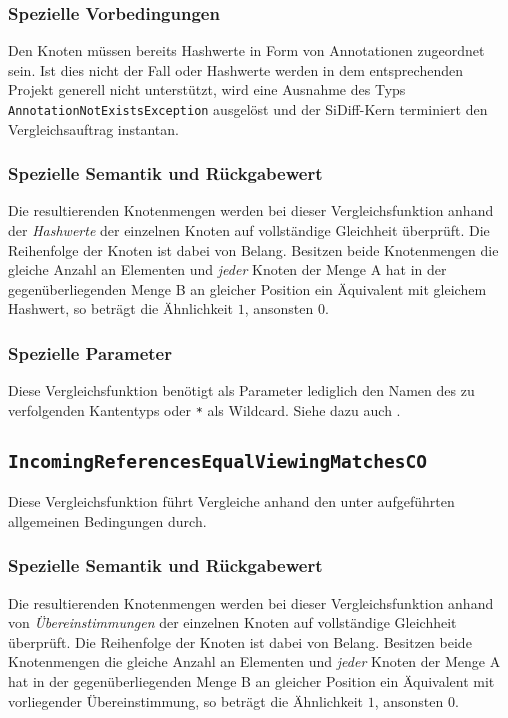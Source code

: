 \subsubsection*{Spezielle Vorbedingungen}
Den Knoten müssen bereits Hashwerte in Form von Annotationen zugeordnet sein. Ist dies nicht der Fall oder Hashwerte werden in dem entsprechenden Projekt generell nicht unterstützt, wird eine Ausnahme des Typs \texttt{AnnotationNotExistsException} ausgelöst und der SiDiff-Kern terminiert den Vergleichsauftrag instantan.

\subsubsection*{Spezielle Semantik und Rückgabewert}
Die resultierenden Knotenmengen werden bei dieser Vergleichsfunktion anhand der \emph{Hashwerte} der einzelnen Knoten auf vollständige Gleichheit überprüft. Die Reihenfolge der Knoten ist dabei von Belang. Besitzen beide Knotenmengen die gleiche Anzahl an Elementen und \emph{jeder} Knoten der Menge A hat in der gegenüberliegenden Menge B an gleicher Position ein Äquivalent mit gleichem Hashwert, so beträgt die Ähnlichkeit $1$, ansonsten $0$.

\subsubsection*{Spezielle Parameter}
Diese Vergleichsfunktion benötigt als Parameter lediglich den Namen des zu verfolgenden Kantentyps oder \texttt{*} als Wildcard. Siehe dazu auch .


%
%
\subsection{\texttt{IncomingReferencesEqualViewingMatchesCO}}
Diese Vergleichsfunktion führt Vergleiche anhand den unter\mylinebreak{} aufgeführten allgemeinen Bedingungen durch.

\subsubsection*{Spezielle Semantik und Rückgabewert}
Die resultierenden Knotenmengen werden bei dieser Vergleichsfunktion anhand von \emph{Übereinstimmungen} der einzelnen Knoten auf vollständige Gleichheit überprüft. Die Reihenfolge der Knoten ist dabei von Belang. Besitzen beide Knotenmengen die gleiche Anzahl an Elementen und \emph{jeder} Knoten der Menge A hat in der gegenüberliegenden Menge B an gleicher Position ein Äquivalent mit vorliegender Übereinstimmung, so beträgt die Ähnlichkeit $1$, ansonsten $0$.

